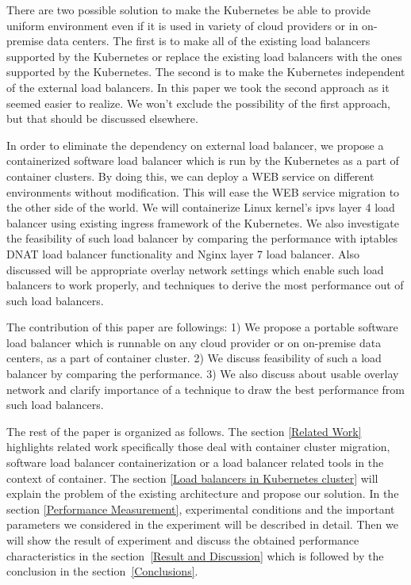 There are two possible solution to make the Kubernetes be able to provide uniform environment even 
if it is used in variety of cloud providers or in on-premise data centers.
The first is to make all of the existing load balancers supported by the Kubernetes 
or replace the existing load balancers with the ones supported by the Kubernetes.
The second is to make the Kubernetes independent of the external load balancers.
In this paper we took the second approach as it seemed easier to realize. 
We won't exclude the possibility of the first approach, but that should be discussed elsewhere.

In order to eliminate the dependency on external load balancer, 
we propose a containerized software load balancer which is run by the Kubernetes as a part of container clusters.
By doing this, we can deploy a WEB service on different environments without modification.
This will ease the WEB service migration to the other side of the world. 
We will containerize Linux kernel's ipvs\cite{Zhang2000} layer 4 load balancer using existing ingress\cite{K8sIngress2017} framework of the Kubernetes. 
We also investigate the feasibility of such load balancer by comparing the performance 
with iptables DNAT load balancer functionality and Nginx layer 7 load balancer.
Also discussed will be appropriate overlay network settings which enable such load balancers to work properly, 
and techniques to derive the most performance out of such load balancers.

The contribution of this paper are followings: 
1) We propose a portable software load balancer 
which is runnable on any cloud provider or on on-premise data centers, 
as a part of container cluster.
2) We discuss feasibility of such a load balancer by comparing the performance.
3) We also discuss about usable overlay network and clarify importance of a technique 
to draw the best performance from such load balancers.  

The rest of the paper is organized as follows.
The section \ref{Related Work} highlights related work specifically those deal with container cluster migration, 
software load balancer containerization or a load balancer related tools in the context of container. 
The section \ref{Load balancers in Kubernetes cluster} will explain the problem of the existing architecture and propose our solution.
In the section \ref{Performance Measurement}, experimental conditions and the important parameters 
we considered in the experiment will be described in detail.
Then we will show the result of experiment and discuss the obtained performance characteristics in the section~\ref{Result and Discussion} 
which is followed by the conclusion in the section~\ref{Conclusions}.
  

